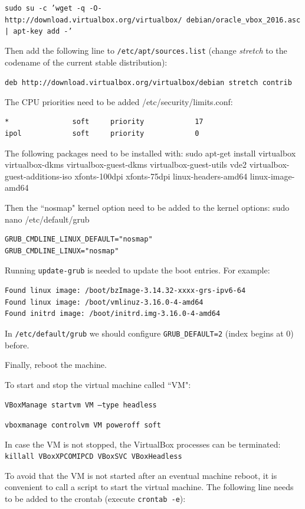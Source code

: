\documentclass[a4paper,12pt]{article}
\begin{document}
{\tt sudo su -c 'wget -q -O- http://download.virtualbox.org/virtualbox/\
debian/oracle\_vbox\_2016.asc | apt-key add -'}

Then add the following line to {\tt /etc/apt/sources.list} (change \emph{stretch} to the codename of the current stable distribution):

{\tt deb http://download.virtualbox.org/virtualbox/debian stretch contrib}

The CPU priorities need to be added /etc/security/limits.conf:
\begin{verbatim}
*               soft     priority            17
ipol            soft     priority            0
\end{verbatim}


The following packages need to be installed with: sudo apt-get install virtualbox virtualbox-dkms virtualbox-guest-dkms virtualbox-guest-utils vde2 virtualbox-guest-additions-iso xfonts-100dpi xfonts-75dpi linux-headers-amd64 linux-image-amd64

Then the ``nosmap" kernel option need to be added to the kernel options: sudo nano /etc/default/grub

\begin{verbatim}
GRUB_CMDLINE_LINUX_DEFAULT="nosmap"
GRUB_CMDLINE_LINUX="nosmap"
\end{verbatim}

Running {\tt update-grub} is needed to update the boot entries. For example:

\begin{verbatim}
Found linux image: /boot/bzImage-3.14.32-xxxx-grs-ipv6-64
Found linux image: /boot/vmlinuz-3.16.0-4-amd64
Found initrd image: /boot/initrd.img-3.16.0-4-amd64
\end{verbatim}

In {\tt /etc/default/grub} we should configure {\tt GRUB\_DEFAULT=2} (index begins at 0) before.

Finally, reboot the machine.

To start and stop the virtual machine called ``VM":

{\tt VBoxManage startvm VM --type headless}

{\tt vboxmanage controlvm VM poweroff soft}

In case the VM is not stopped, the VirtualBox processes can be terminated: {\tt killall VBoxXPCOMIPCD VBoxSVC VBoxHeadless}

To avoid that the VM is not started after an eventual machine reboot, it is convenient to call a script to start the virtual machine. The following line needs to be added to the crontab (execute {\tt crontab -e}):
\end{document}
